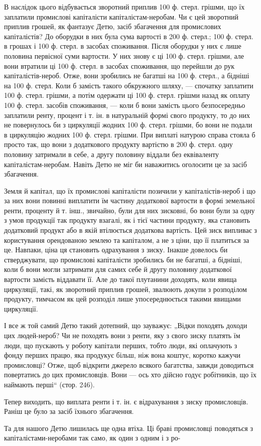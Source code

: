 В наслідок цього відбувається зворотний приплив 100 ф. стерл. грішми, що їх заплатили промислові
капіталісти капіталістам-неробам. Чи є цей зворотний приплив грошей, як фантазує Детю, засіб
збагачення для промислових капіталістів? До оборудки в них була сума вартості в 200 ф. стерл.; 100
ф. стерл. в грошах і 100 ф. стерл. в засобах споживання. Після оборудки у них є лише половина
первісної суми вартости. У них знову є ці 100 ф. стерл. грішми, але вони втратили ці 100 ф. стерл. в
засобах споживання, що перейшли до рук капіталістів-нероб. Отже, вони зробились не багатші на 100 ф.
стерл., а бідніші на 100 ф. стерл. Коли б замість такого обкружного шляху, — спочатку заплатити 100
ф. стерл. грішми, а потім одержати ці 100 ф. стерл. грішми назад як оплату 100 ф. стерл. засобів
споживання, — коли б вони замість цього безпосередньо заплатили ренту, процент і т. ін. в
натуральній формі свого продукту, то до них не повернулось би з циркуляції жодних 100 ф. стерл.
грішми, бо вони не подали в циркуляцію жодних 100 ф. стерл. грішми. При виплаті натурою справа
стояла б просто так, що вони з додаткового продукту вартістю в 200 ф. стерл. одну половину затримали
в себе, а другу половину віддали без еквіваленту капіталістам-неробам. Навіть Детю не міг би
наважитись оголосити це за засіб збагачення.

Земля й капітал, що їх промислові капіталісти позичили у капіталістів-нероб і що за них вони повинні
виплатити їм частину додаткової вартости в формі земельної ренти, проценту й т. інш., звичайно, були
для них зисковні, бо вони були за одну з умов продукції так продукту взагалі, як і тієї частини
продукту, яка становить додатковий продукт або в якій втілюється додаткова вартість. Цей зиск
випливає з користування орендованою землею та капіталом, а не з ціни, що її платиться за це.
Навпаки, ціна ця становить одрахування з зиску. Інакше довелось би стверджувати, що промислові
капіталісти зробились би не багатші, а бідніші, коли б вони могли затримати для самих себе й другу
половину додаткової вартости замість віддавати її. Але до такої плутанини доходять, коли явища
циркуляції, такі, як зворотний приплив грошей, звалюють докупи з розподілом продукту, тимчасом як
цей розподіл лише упосереднюється такими явищами циркуляції.

І все ж той самий Детю такий дотепний, що зауважує: „Відки походять доходи цих людей-нероб? Чи не
походять вони з ренти, яку з свого зиску платять їм люди, що пускають у роботу капітали перших,
тобто люди, які оплачують з фонду перших працю, яка продукує більш, ніж вона коштує, коротко кажучи
промисловці? Отже, щоб відкрити джерело всякого багатства, завжди доводиться повертатись до цих
промисловців. Вони — ось хто дійсно годує робітників, що їх наймають перші“ (стор. 246).

Тепер виходить, що виплата ренти і т. ін. є відрахування з зиску промисловців. Раніш це було за
засіб їхнього збагачення.

Та для нашого Детю лишилась ще одна втіха. Ці браві промисловці поводяться з капіталістами-неробами
так само, як один з одним і з ро-
\parbreak{}  %

